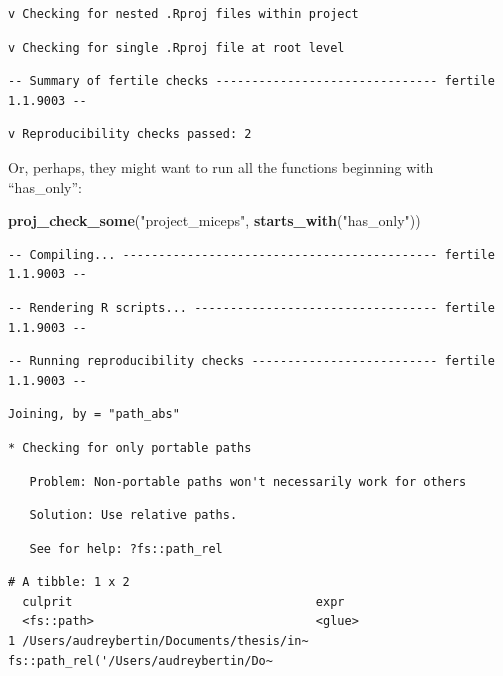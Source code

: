 \documentclass[12pt,twoside]{reedthesis}
\newenvironment{Shaded}{\begin{snugshade}}{\end{snugshade}}
\newcommand{\KeywordTok}[1]{\textcolor[rgb]{0.13,0.29,0.53}{\textbf{#1}}}
\newcommand{\NormalTok}[1]{#1}
\newcommand{\StringTok}[1]{\textcolor[rgb]{0.31,0.60,0.02}{#1}}
\begin{document}
\begin{verbatim}
v Checking for nested .Rproj files within project
\end{verbatim}
\begin{verbatim}
v Checking for single .Rproj file at root level
\end{verbatim}
\begin{verbatim}
-- Summary of fertile checks ------------------------------- fertile 1.1.9003 --
\end{verbatim}
\begin{verbatim}
v Reproducibility checks passed: 2
\end{verbatim}
Or, perhaps, they might want to run all the functions beginning with ``has\_only'':
\begin{Shaded}
\begin{Highlighting}[]
\KeywordTok{proj_check_some}\NormalTok{(}\StringTok{"project_miceps"}\NormalTok{, }\KeywordTok{starts_with}\NormalTok{(}\StringTok{"has_only"}\NormalTok{))}
\end{Highlighting}
\end{Shaded}
\begin{verbatim}
-- Compiling... -------------------------------------------- fertile 1.1.9003 --
\end{verbatim}
\begin{verbatim}
-- Rendering R scripts... ---------------------------------- fertile 1.1.9003 --
\end{verbatim}
\begin{verbatim}
-- Running reproducibility checks -------------------------- fertile 1.1.9003 --
\end{verbatim}
\begin{verbatim}
Joining, by = "path_abs"
\end{verbatim}
\begin{verbatim}
* Checking for only portable paths
\end{verbatim}
\begin{verbatim}
   Problem: Non-portable paths won't necessarily work for others
\end{verbatim}
\begin{verbatim}
   Solution: Use relative paths.
\end{verbatim}
\begin{verbatim}
   See for help: ?fs::path_rel
\end{verbatim}
\begin{verbatim}
# A tibble: 1 x 2
  culprit                                  expr                                 
  <fs::path>                               <glue>                               
1 /Users/audreybertin/Documents/thesis/in~ fs::path_rel('/Users/audreybertin/Do~
\end{verbatim}
\end{document}
